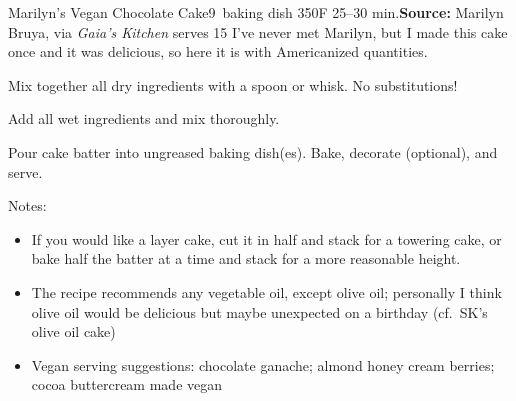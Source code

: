 \begin{recipe}{Marilyn's Vegan Chocolate Cake}{9\inch{}\inch\ baking dish \hfill 350\0F \hfill 25--30 min.}{\textbf{Source:} Marilyn Bruya, via \textit{Gaia's Kitchen} \hfill serves 15}
  \freeform I've never met Marilyn, but I made this cake once and it was delicious, so here it is with Americanized quantities.

Mix together all dry ingredients with a spoon or whisk. No substitutions!

Add all wet ingredients and mix thoroughly.

\newstep Pour cake batter into ungreased baking dish(es). Bake, decorate (optional), and serve.

\freeform Notes:
\begin{itemize}
  \item If you would like a layer cake, cut it in half and stack for a towering cake, or bake half the batter at a time and stack for a more reasonable height.
  \item The recipe recommends any vegetable oil, except olive oil; personally I think olive oil would be delicious but maybe unexpected on a birthday (cf.\ SK's olive oil cake)
  \item Vegan serving suggestions: chocolate ganache; almond honey cream \And berries; cocoa buttercream made vegan
\end{itemize}
\end{recipe}